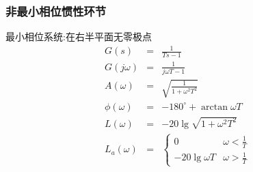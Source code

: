 \documentclass[table]{beamer}
\begin{document}
\begin{frame}
\frametitle{非最小相位惯性环节}
\label{sec-2-4-3}

最小相位系统:在右半平面无零极点
\begin{eqnarray*}
G(s) & = & \frac{1}{Ts-1}\\
G(j\omega) & =& \frac{1}{j\omega T-1}\\
A(\omega) &=& \sqrt{\frac{1}{1+\omega^2 T^2}}\\
\phi(\omega) &=& -180^{\circ}+\arctan{\omega T} \\
L(\omega)&=& -20\lg\sqrt{1+\omega^2 T^2}\\
L_a(\omega)&=& \begin{cases} 0 & \omega<\frac{1}{T} \\  -20\lg\omega T & \omega>\frac{1}{T}\end{cases}
\end{eqnarray*}
\end{frame}
\end{document}
